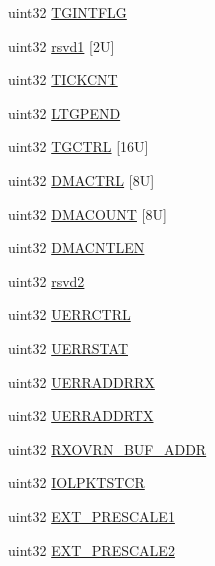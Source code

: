 \begin{DoxyCompactItemize}
\item 
uint32 \mbox{\hyperlink{structmibspiBase_a156440dc0e70a376ce4e24ab2508fe4d}{T\+G\+I\+N\+T\+F\+LG}}
\item 
uint32 \mbox{\hyperlink{structmibspiBase_abbb7e87f75ef1931dd2ebcf0f35bdd29}{rsvd1}} \mbox{[}2\+U\mbox{]}
\item 
uint32 \mbox{\hyperlink{structmibspiBase_a1174646e26983c4e4ffeeffd15c1d7bd}{T\+I\+C\+K\+C\+NT}}
\item 
uint32 \mbox{\hyperlink{structmibspiBase_ae3903b6246922258a18e0415487a762e}{L\+T\+G\+P\+E\+ND}}
\item 
uint32 \mbox{\hyperlink{structmibspiBase_a48eef09749161b1785ac0ab946ad0e5e}{T\+G\+C\+T\+RL}} \mbox{[}16\+U\mbox{]}
\item 
uint32 \mbox{\hyperlink{structmibspiBase_a20dfe9f5fcfad9e59148380590e72882}{D\+M\+A\+C\+T\+RL}} \mbox{[}8\+U\mbox{]}
\item 
uint32 \mbox{\hyperlink{structmibspiBase_ad8c8fd9f23925f0da5335153c15b769d}{D\+M\+A\+C\+O\+U\+NT}} \mbox{[}8\+U\mbox{]}
\item 
uint32 \mbox{\hyperlink{structmibspiBase_ad9412981fcaea75492a25f1f403d73b3}{D\+M\+A\+C\+N\+T\+L\+EN}}
\item 
uint32 \mbox{\hyperlink{structmibspiBase_a31c6f1f004e1974e93004e7948374170}{rsvd2}}
\item 
uint32 \mbox{\hyperlink{structmibspiBase_a2d0f4fac8357b3c6fc5c407b45723062}{U\+E\+R\+R\+C\+T\+RL}}
\item 
uint32 \mbox{\hyperlink{structmibspiBase_a9f674f149ade46f4bbbb327eb40828e3}{U\+E\+R\+R\+S\+T\+AT}}
\item 
uint32 \mbox{\hyperlink{structmibspiBase_a9abd29e58728253bbc8e8685dbe6a0df}{U\+E\+R\+R\+A\+D\+D\+R\+RX}}
\item 
uint32 \mbox{\hyperlink{structmibspiBase_a7def0abd4b117621f5b6897b1de9be60}{U\+E\+R\+R\+A\+D\+D\+R\+TX}}
\item 
uint32 \mbox{\hyperlink{structmibspiBase_aea585f12cb9a74e001158877e333b255}{R\+X\+O\+V\+R\+N\+\_\+\+B\+U\+F\+\_\+\+A\+D\+DR}}
\item 
uint32 \mbox{\hyperlink{structmibspiBase_abfecfae4c3cc3f18f742fe103485ebf0}{I\+O\+L\+P\+K\+T\+S\+T\+CR}}
\item 
uint32 \mbox{\hyperlink{structmibspiBase_a23996aa9c43307db447af3b0db7bac4a}{E\+X\+T\+\_\+\+P\+R\+E\+S\+C\+A\+L\+E1}}
\item 
uint32 \mbox{\hyperlink{structmibspiBase_ae5518544a750de660142354c84114f7b}{E\+X\+T\+\_\+\+P\+R\+E\+S\+C\+A\+L\+E2}}
\end{DoxyCompactItemize}



